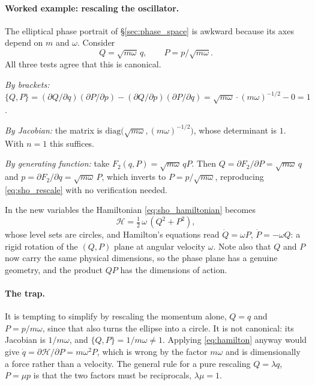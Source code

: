 \documentclass[12pt]{article}
\newcommand{\Ham}{\mathcal{H}}
\newcommand{\pb}[2]{\{#1,#2\}}
\begin{document}
\paragraph{Worked example: rescaling the oscillator.}  The elliptical
phase portrait of \S\ref{sec:phase_space} is awkward because its axes
depend on $m$ and $\omega$.  Consider
%
\begin{equation}
  Q = \sqrt{m\omega}\,q ,
  \qquad
  P = p/\!\sqrt{m\omega} .
  \label{eq:sho_rescale}
\end{equation}
%
All three tests agree that this is canonical.

\emph{By brackets:}
$\pb{Q}{P} = (\partial Q/\partial q)(\partial P/\partial p)
- (\partial Q/\partial p)(\partial P/\partial q)
= \sqrt{m\omega}\cdot(m\omega)^{-1/2} - 0 = 1$.

\emph{By Jacobian:} the matrix is
$\mathrm{diag}\bigl(\sqrt{m\omega},(m\omega)^{-1/2}\bigr)$, whose
determinant is $1$.  With $n = 1$ this suffices.

\emph{By generating function:} take
$F_2(q,P) = \sqrt{m\omega}\,qP$.  Then
$Q = \partial F_2/\partial P = \sqrt{m\omega}\,q$ and
$p = \partial F_2/\partial q = \sqrt{m\omega}\,P$, which inverts to
$P = p/\!\sqrt{m\omega}$, reproducing \eqref{eq:sho_rescale} with no
verification needed.

In the new variables the Hamiltonian \eqref{eq:sho_hamiltonian}
becomes
%
\begin{equation}
  \Ham = \tfrac12\,\omega\,(Q^2 + P^2) ,
\end{equation}
%
whose level sets are circles, and Hamilton's equations read
$\dot Q = \omega P$, $\dot P = -\omega Q$: a rigid rotation of the
$(Q,P)$ plane at angular velocity $\omega$.  Note also that $Q$ and $P$
now carry the same physical dimensions, so the phase plane has a
genuine geometry, and the product $QP$ has the dimensions of action.

\paragraph{The trap.}  It is tempting to simplify by rescaling the
momentum alone, $Q = q$ and $P = p/m\omega$, since that also turns the
ellipse into a circle.  It is not canonical: its Jacobian is
$1/m\omega$, and $\pb{Q}{P} = 1/m\omega \neq 1$.  Applying
\eqref{eq:hamilton} anyway would give
$\dot q = \partial\Ham/\partial P = m\omega^2 P$, which is wrong by the
factor $m\omega$ and is dimensionally a force rather than a velocity.
The general rule for a pure rescaling $Q = \lambda q$, $P = \mu p$ is
that the two factors must be reciprocals, $\lambda\mu = 1$.
\end{document}
